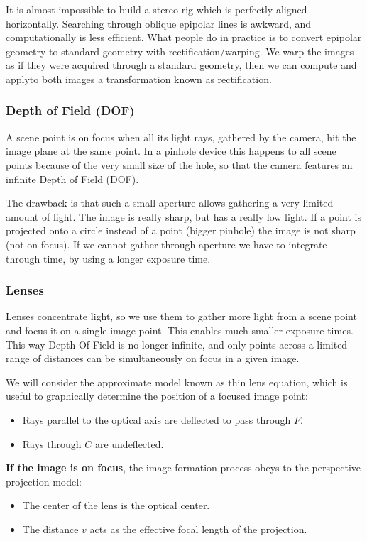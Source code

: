 \documentclass{article}
\begin{document}
It is almost impossible to build a stereo rig which is perfectly aligned horizontally.
Searching through oblique epipolar lines is awkward, and computationally is less efficient.
What people do in practice is to convert epipolar geometry to standard geometry with rectification/warping.
We warp the images as if they were acquired through a standard geometry, then we can compute and applyto both images a transformation known as rectification.

\subsubsection{Depth of Field (DOF)}

A scene point is on focus when all its light rays, gathered by the camera, hit the image plane at the same point.
In a pinhole device this happens to all scene points because of the very small size of the hole, so that the camera features an infinite Depth of Field (DOF).

The drawback is that such a small aperture allows gathering a very limited amount of light.
The image is really sharp, but has a really low light.
If a point is projected onto a circle instead of a point (bigger pinhole) the image is not sharp (not on focus).
If we cannot gather through aperture we have to integrate through time, by using a longer exposure time.

\subsubsection{Lenses}

Lenses concentrate light, so we use them to gather more light from a scene point and focus it on a single image point.
This enables much smaller exposure times.
This way Depth Of Field is no longer infinite, and only points across a limited range of distances can be simultaneously on focus in a given image.


We will consider the approximate model known as thin lens equation, which is useful to graphically determine the position of a focused image point:
\begin{itemize}
  \item Rays parallel to the optical axis are deflected to pass through $F$.
  \item Rays through $C$ are undeflected.
\end{itemize}

\textbf{If the image is on focus}, the image formation process obeys to the perspective projection model:
\begin{itemize}
  \item The center of the lens is the optical center.
  \item The distance $v$ acts as the effective focal length of the projection.
\end{itemize}
\end{document}
